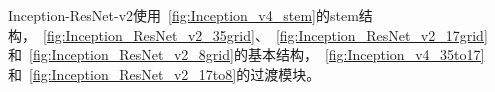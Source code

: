 Inception-ResNet-v2使用~\ref{fig:Inception_v4_stem}的stem结构，~\ref{fig:Inception_ResNet_v2_35grid}、~\ref{fig:Inception_ResNet_v2_17grid}和~\ref{fig:Inception_ResNet_v2_8grid}的基本结构，~\ref{fig:Inception_v4_35to17}和~\ref{fig:Inception_ResNet_v2_17to8}的过渡模块。

\begin{figure}[htbp]
	\centering
	\centering
\end{figure}
